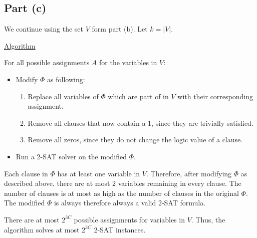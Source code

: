 \subsection*{Part (c)}

We continue using the set $V$ form part (b).  Let $k = |V|$.


\underline{Algorithm}


For all possible assignments $A$ for the variables in $V$:

\begin{itemize}
    \item Modify $\Phi$ as following: 
    \begin{enumerate}
        \item Replace all variables of $\Phi$ which are part of in $V$ with their corresponding assignment.
        \item Remove all clauses that now contain a $1$, since they are trivially satisfied.
        \item Remove all zeros, since they do not change the logic value of a clause.
    \end{enumerate}
    \item Run a 2-SAT solver on the modified $\Phi$.
\end{itemize}

Each clause in $\Phi$ has at least one variable in $V$. Therefore, after modifying $\Phi$ as described above, there are at most 2 variables remaining in every clause. The number of clauses is at most as high as the number of clauses in the original $\Phi$. The modified $\Phi$ is always therefore always a valid 2-SAT formula.

There are at most $2^{3C}$ possible assignments for variables in $V$. Thus, the algorithm solves at most $2^{3C}$ 2-SAT instances.

\pagebreak